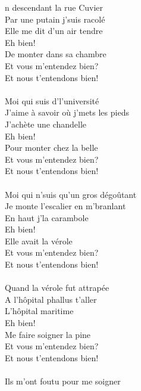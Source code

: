 
n descendant la rue Cuvier \bissimple
\\Par une putain j'suis racolé \bissimple
\\ Elle me dit d'un air tendre
\\Eh bien!
\\De monter dans sa chambre
\\Et vous m'entendez bien?
\\Et nous t'entendons bien!
\\\\Moi qui suis d'l'université \bissimple
\\J'aime à savoir où j'mets les pieds \bissimple
\\J'achète une chandelle
\\Eh bien!
\\Pour monter chez la belle
\\Et vous m'entendez bien?
\\Et nous t'entendons bien!
\\\\Moi qui n'suis qu'un gros dégoûtant \bissimple
\\Je monte l'escalier en m'branlant \bissimple
\\En haut j'la carambole
\\Eh bien!
\\Elle avait la vérole
\\Et vous m'entendez bien?
\\Et nous t'entendons bien!
\\\\Quand la vérole fut attrapée \bissimple
\\A l'hôpital phallus t'aller \bissimple
\\L'hôpital maritime
\\Eh bien!
\\Me faire soigner la pine
\\Et vous m'entendez bien?
\\Et nous t'entendons bien!
\breakpage
\\\\Ils m'ont foutu pour me soigner \bissimple
